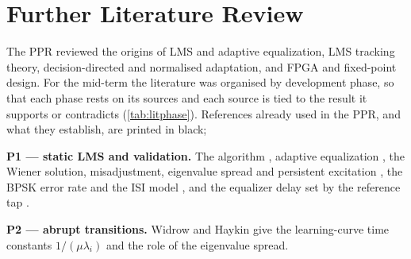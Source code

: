 \section{Further Literature Review}
\label{sec:literature}
The PPR reviewed the origins of LMS and adaptive equalization, LMS tracking theory, decision-directed and normalised adaptation, and FPGA and fixed-point design. For the mid-term the literature was organised by development phase, so that each phase rests on its sources and each source is tied to the result it supports or contradicts (\cref{tab:litphase}). References already used in the PPR, and what they establish, are printed in black; 

\noindent\textbf{P1 --- static LMS and validation.} The algorithm \cite{widrowhoff1960}, adaptive equalization \cite{lucky1965,qureshi1985}, the Wiener solution, misadjustment, eigenvalue spread and persistent excitation \cite{widrowstearns1985,haykin2014}, the BPSK error rate and the ISI model \cite{proakis2008}, and the equalizer delay set by the reference tap \cite{qureshi1985}. 

\noindent\textbf{P2 --- abrupt transitions.} Widrow \etal \cite{widrow1976} and Haykin \cite{haykin2014} give the learning-curve time constants $1/(\mu\lambda_i)$ and the role of the eigenvalue spread. 

